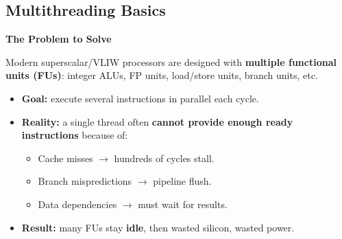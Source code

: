 \subsection{Multithreading Basics}\label{subsection: Multithreading Basics}

\begin{flushleft}
    \textcolor{Red2}{ \textbf{The Problem to Solve}}
\end{flushleft}
Modern superscalar/VLIW processors are designed with \textbf{multiple functional units (FUs)}: integer ALUs, FP units, load/store units, branch units, etc.
\begin{itemize}
    \item[\textcolor{Green3}{\faIcon{bullseye}}] \textcolor{Green3}{\textbf{Goal:}} execute several instructions in parallel each cycle.
    \item[\textcolor{Red2}{\faIcon{exclamation-triangle}}] \textcolor{Red2}{\textbf{Reality:}} a single thread often \textbf{cannot provide enough ready instructions} because of:
    \begin{itemize}
        \item Cache misses $\rightarrow$ hundreds of cycles stall.
        \item Branch mispredictions $\rightarrow$ pipeline flush.
        \item Data dependencies $\rightarrow$ must wait for results.
    \end{itemize}
    \item[\textcolor{Red2}{\faIcon{thumbs-down}}] \textcolor{Red2}{\textbf{Result:}} many FUs stay \textbf{idle}, then wasted silicon, wasted power.
\end{itemize}

